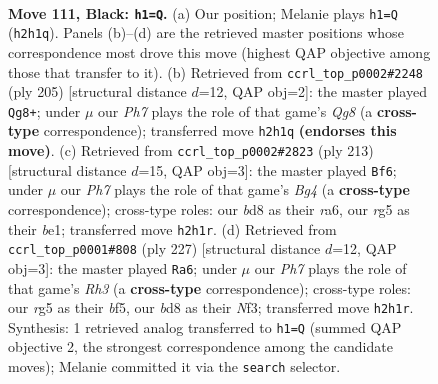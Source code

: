 \documentclass[11pt]{article}
\begin{document}
\begin{figure}[p]\centering
\begin{subfigure}{0.46\textwidth}\centering
\resizebox{\linewidth}{!}{%
\newchessgame
\chessboard[
  setfen={3B4/1k6/8/3N2R1/2K5/8/7p/8 b - - 1 111},
  showmover=false,
  pgfstyle=straightmove, color=movearrow, markmove={h2-h1}
]}
\caption{}
\end{subfigure}\hfill
\begin{subfigure}{0.46\textwidth}\centering
\resizebox{\linewidth}{!}{%
\newchessgame
\chessboard[
  setfen={8/8/3k4/8/8/1KNB4/4R3/6q1 b - - 4 103},
  showmover=false,
  pgfstyle=straightmove, color=movearrow, markmove={g1-g8}
]}
\caption{}
\end{subfigure}
\\[4pt]
\begin{subfigure}{0.46\textwidth}\centering
\resizebox{\linewidth}{!}{%
\newchessgame
\chessboard[
  setfen={8/8/R7/5kb1/1NK5/7r/8/4B3 b - - 81 107},
  showmover=false,
  pgfstyle=straightmove, color=movearrow, markmove={g5-f6}
]}
\caption{}
\end{subfigure}\hfill
\begin{subfigure}{0.46\textwidth}\centering
\resizebox{\linewidth}{!}{%
\newchessgame
\chessboard[
  setfen={8/8/7r/3K1B2/4N3/5n2/1k6/8 b - - 67 114},
  showmover=false,
  pgfstyle=straightmove, color=movearrow, markmove={h6-a6}
]}
\caption{}
\end{subfigure}
\caption{\textbf{Move 111, Black: \texttt{h1=Q}.} (a) Our position; Melanie plays \texttt{h1=Q} (\texttt{h2h1q}). Panels (b)--(d) are the retrieved master positions whose correspondence most drove this move (highest QAP objective among those that transfer to it). (b) Retrieved from \texttt{ccrl\_top\_p0002\#2248} (ply 205) [structural distance $d$=12, QAP obj=2]: the master played \texttt{Qg8+}; under $\mu$ our \emph{Ph7} plays the role of that game's \emph{Qg8} (a \textbf{cross-type} correspondence); transferred move \texttt{h2h1q} \textbf{(endorses this move)}. (c) Retrieved from \texttt{ccrl\_top\_p0002\#2823} (ply 213) [structural distance $d$=15, QAP obj=3]: the master played \texttt{Bf6}; under $\mu$ our \emph{Ph7} plays the role of that game's \emph{Bg4} (a \textbf{cross-type} correspondence); cross-type roles: our \emph{b}d8 as their \emph{r}a6, our \emph{r}g5 as their \emph{b}e1; transferred move \texttt{h2h1r}. (d) Retrieved from \texttt{ccrl\_top\_p0001\#808} (ply 227) [structural distance $d$=12, QAP obj=3]: the master played \texttt{Ra6}; under $\mu$ our \emph{Ph7} plays the role of that game's \emph{Rh3} (a \textbf{cross-type} correspondence); cross-type roles: our \emph{r}g5 as their \emph{b}f5, our \emph{b}d8 as their \emph{N}f3; transferred move \texttt{h2h1r}. Synthesis: 1 retrieved analog transferred to \texttt{h1=Q} (summed QAP objective 2, the strongest correspondence among the candidate moves); Melanie committed it via the \texttt{search} selector.}
\label{fig:thought-m221}
\end{figure}
\end{document}
